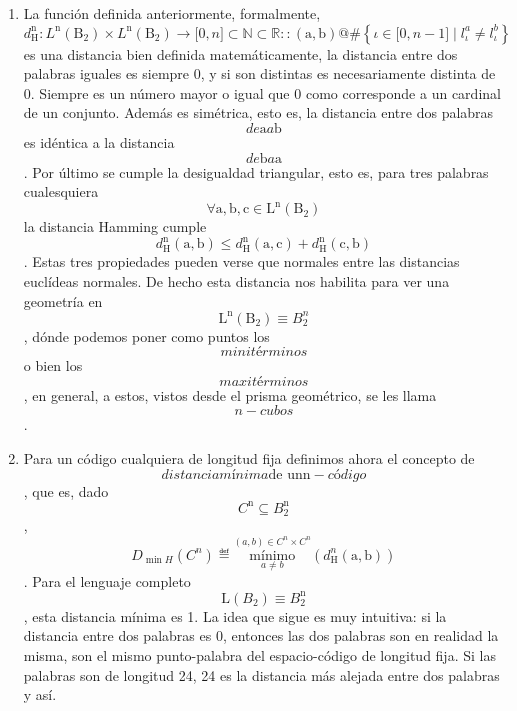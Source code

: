 \documentclass[
]{article}
\begin{document}
\begin{enumerate}
\begin{enumerate}
\begin{enumerate}
      En palabras, es el número de bits que son diferentes entre ambas
      palabras (posición por posición).
    \item
      La función definida anteriormente, formalmente,\emph{
      \[d_{\mathtt{\mathrm{H}}}^{\mathtt{\mathrm{n}}}:L^{\mathtt{\mathrm{n}}}{\left( \mathtt{\mathrm{B_{2}}} \right) \times L^{\mathtt{\mathrm{n}}}}{{{\left( \mathtt{\mathrm{B_{2}}} \right)\rightarrow{\lbrack{0,n}\rbrack}} \subset \mathbb{N}} \subset \mathbb{R}}::\left( \mathtt{\mathrm{a,b}} \right)@\#\left\{ {{\iota \in {\lbrack{0,{n - 1}}\rbrack}} \mid {l_{\iota}^{a} \neq l_{\iota}^{b}}} \right\}\]}es
      una distancia bien definida matemáticamente, la distancia entre
      dos palabras iguales es siempre 0, y si son distintas es
      necesariamente distinta de 0. Siempre es un número mayor o igual
      que 0 como corresponde a un cardinal de un conjunto. Además es
      si\-métrica, esto es, la distancia entre dos palabras
      \[\mathit{de}\mathtt{\mathrm{a}}a\mathtt{\mathrm{b}}\] es idéntica
      a la distancia
      \[\mathit{de}\mathtt{\mathrm{b}}a\mathtt{\mathrm{a}}\]. Por último
      se cumple la desigualdad triangular, esto es, para tres palabras
      cuales\-quiera
      \[\forall{\mathtt{\mathrm{a,b,c}} \in \mathtt{\mathrm{L^{n}}}}\left( \mathtt{\mathrm{B_{2}}} \right)\]
      la distancia Hamming cumple
      \[d_{\mathtt{\mathrm{H}}}^{\mathtt{\mathrm{n}}}{\left( \mathtt{\mathrm{a,b}} \right) \leq {d_{\mathtt{\mathrm{H}}}^{\mathtt{\mathrm{n}}}{\left( \mathtt{\mathrm{a,c}} \right) + d_{\mathtt{\mathrm{H}}}^{\mathtt{\mathrm{n}}}}\left( \mathtt{\mathrm{c,b}} \right)}}\].
      Estas tres propiedades pueden verse que normales entre las
      distancias euclídeas normales. De hecho esta distancia nos
      habilita para ver una geometría
      en\[\mathtt{\mathrm{L^{n}}}{\left( \mathtt{\mathrm{B_{2}}} \right) \equiv B_{2}^{n}}\],
      dónde podemos poner como puntos los \[\mathit{minitérminos}\]o
      bien los \[\mathit{maxitérminos}\], en general, a estos, vistos
      desde el pris\-ma geométrico, se les llama \[n - \mathit{cubos}\].
    \item
      Para un código cualquiera de longitud fija definimos ahora el
      concepto de
      \[\mathit{distancia}\mathit{mínima}\text{de un}{\mathtt{\mathrm{n}} - \mathit{código}}\],
      que es, dado
      \[C^{\mathtt{\mathrm{n}}} \subseteq B_{2}^{\mathtt{\mathrm{n}}}\],
      \[D_{\min H}\left( C^{n} \right) ≝ \underset{a \neq b}{\overset{{({a,b})} \in {C^{n} \times C^{n}}}{\mathtt{\mathrm{mínimo}}}}\left( {d_{\mathtt{\mathrm{H}}}^{n}\left( \mathtt{\mathrm{a,b}} \right)} \right)\].
      Para el lenguaje completo
      \[\mathtt{\mathrm{L}}{\left( B_{2} \right) \equiv B_{2}^{\mathtt{\mathrm{n}}}}\],
      esta distancia mínima es 1. La idea que sigue es muy intuitiva: si
      la distancia entre dos palabras es 0, entonces las dos palabras
      son en realidad la misma, son el mismo pun\-to-palabra del
      espacio-código de longitud fija. Si las palabras son de longitud
      24, 24 es la distancia más alejada entre dos palabras y así.


\end{enumerate}
\end{enumerate}
\end{enumerate}
\end{document}
